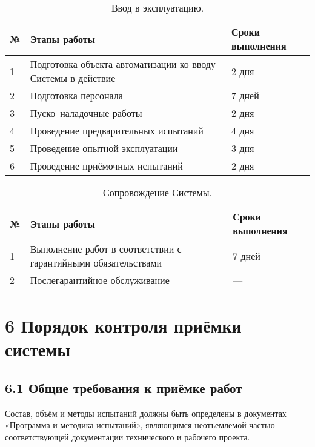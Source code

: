\begin{table}[H]
\caption{\label{tab:Task7}
Ввод в эксплуатацию.}
\begin{center}
\begin{tabular}{|p{1cm}||p{9cm}|p{4cm}|}
\hline
№ & Этапы работы & Сроки выполнения \\
\hline
\hline
1 & Подготовка объекта автоматизации ко вводу Системы
в действие & 2 дня \\
\hline
2 & Подготовка персонала & 7 дней \\
\hline
3 & Пуско--наладочные работы & 2 дня \\
\hline
4 & Проведение предварительных испытаний & 4 дня \\
\hline
5 & Проведение опытной эксплуатации & 3 дня \\
\hline
6 & Проведение приёмочных испытаний & 2 дня \\
\hline
\end{tabular}
\end{center}
\end{table}
\begin{table}[H]
\caption{\label{tab:Task8}
Сопровождение Системы.}
\begin{center}
\begin{tabular}{|p{1cm}||p{9cm}|p{4cm}|}
\hline
№ & Этапы работы & Сроки выполнения \\
\hline
\hline
1 & Выполнение работ в соответствии с гарантийными
обязательствами & 7 дней \\
\hline
2 & Послегарантийное обслуживание & — \\
\hline
\end{tabular}
\end{center}
\end{table}

\section*{6 Порядок контроля приёмки системы}
\subsection*{6.1 Общие требования к приёмке работ}
Состав, объём и методы испытаний должны быть определены в документах
«Программа и методика испытаний», являющимся неотъемлемой частью
соответствующей документации технического и рабочего проекта.

